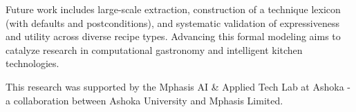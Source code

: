 \documentclass[sigconf]{acmart}
\begin{document}
Future work includes large-scale extraction, construction of a technique lexicon (with defaults and postconditions), and systematic validation of expressiveness and utility across diverse recipe types. Advancing this formal modeling aims to catalyze research in computational gastronomy and intelligent kitchen technologies.

\begin{acks}
    This research was supported by the Mphasis AI \& Applied Tech Lab at Ashoka - a collaboration between Ashoka University and Mphasis Limited.
\end{acks}



\end{document}

